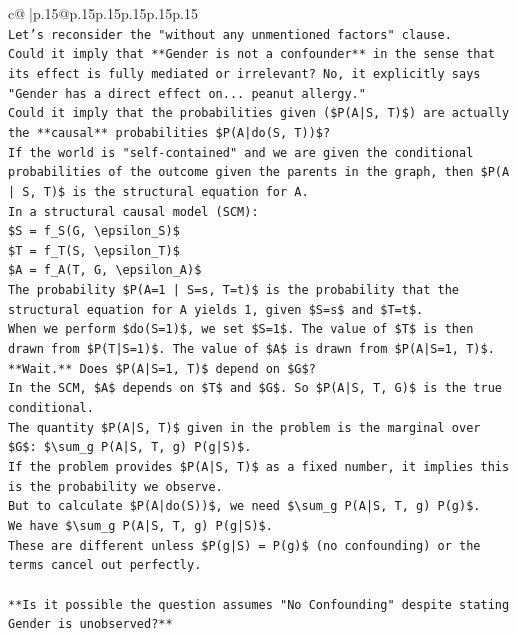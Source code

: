 \documentclass{article}
\begin{document}
{\begin{supertabular}{c@{$\;$}|p{.15\linewidth}@{}p{.15\linewidth}p{.15\linewidth}p{.15\linewidth}p{.15\linewidth}p{.15\linewidth}}
{{{\\ 
\texttt{Let's reconsider the "without any unmentioned factors" clause.} \\
\texttt{Could it imply that **Gender is not a confounder** in the sense that its effect is fully mediated or irrelevant? No, it explicitly says "Gender has a direct effect on... peanut allergy."} \\
\texttt{Could it imply that the probabilities given (\$P(A|S, T)\$) are actually the **causal** probabilities \$P(A|do(S, T))\$?} \\
\texttt{If the world is "self{-}contained" and we are given the conditional probabilities of the outcome given the parents in the graph, then \$P(A | S, T)\$ is the structural equation for A.} \\
\texttt{In a structural causal model (SCM):} \\
\texttt{\$S = f\_S(G, \textbackslash{}epsilon\_S)\$} \\
\texttt{\$T = f\_T(S, \textbackslash{}epsilon\_T)\$} \\
\texttt{\$A = f\_A(T, G, \textbackslash{}epsilon\_A)\$} \\
\texttt{The probability \$P(A=1 | S=s, T=t)\$ is the probability that the structural equation for A yields 1, given \$S=s\$ and \$T=t\$.} \\
\texttt{When we perform \$do(S=1)\$, we set \$S=1\$. The value of \$T\$ is then drawn from \$P(T|S=1)\$. The value of \$A\$ is drawn from \$P(A|S=1, T)\$.} \\
\texttt{**Wait.** Does \$P(A|S=1, T)\$ depend on \$G\$?} \\
\texttt{In the SCM, \$A\$ depends on \$T\$ and \$G\$. So \$P(A|S, T, G)\$ is the true conditional.} \\
\texttt{The quantity \$P(A|S, T)\$ given in the problem is the marginal over \$G\$: \$\textbackslash{}sum\_g P(A|S, T, g) P(g|S)\$.} \\
\texttt{If the problem provides \$P(A|S, T)\$ as a fixed number, it implies this is the probability we observe.} \\
\texttt{But to calculate \$P(A|do(S))\$, we need \$\textbackslash{}sum\_g P(A|S, T, g) P(g)\$.} \\
\texttt{We have \$\textbackslash{}sum\_g P(A|S, T, g) P(g|S)\$.} \\
\texttt{These are different unless \$P(g|S) = P(g)\$ (no confounding) or the terms cancel out perfectly.} \\
\\ 
\texttt{**Is it possible the question assumes "No Confounding" despite stating Gender is unobserved?**} \\
}}}
\end{supertabular}}
\end{document}

